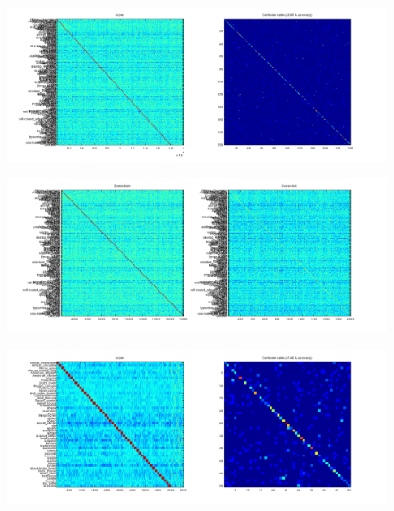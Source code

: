 \documentclass[10pt,two column,letter paper]{article}
\begin{document}
\begin{figure}[t]
\begin{center}
\includegraphics[width=0.9\linewidth]{m2_imagenet_tiny.png}
\end{center}
   \caption{}
\label{fig:m2_imagenet_tiny}
\end{figure}

\begin{figure}[t]
\begin{center}
\includegraphics[width=0.9\linewidth]{m2-2_imagenet_tiny.png}
\end{center}
   \caption{}
\label{fig:m2-2_imagenet_tiny}
\end{figure}

\begin{figure}[t]
\begin{center}
\includegraphics[width=0.9\linewidth]{m14_imagenet_tiny.png}
\end{center}
   \caption{}
\label{fig:m14_imagenet_tiny}
\end{figure}
\end{document}
